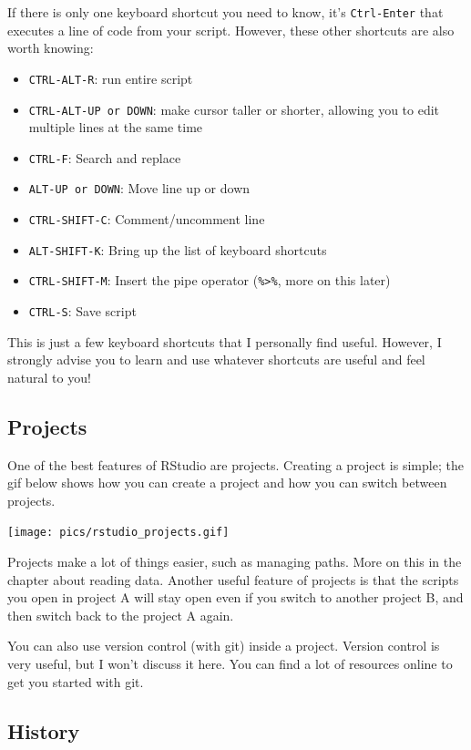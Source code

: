 \documentclass[
]{article}
\providecommand{\tightlist}{%
  \setlength{\itemsep}{0pt}\setlength{\parskip}{0pt}}
\begin{document}
If there is only one keyboard shortcut you need to know, it's \texttt{Ctrl-Enter} that executes a line of code
from your script. However, these other shortcuts are also worth knowing:

\begin{itemize}
\tightlist
\item
  \texttt{CTRL-ALT-R}: run entire script
\item
  \texttt{CTRL-ALT-UP\ or\ DOWN}: make cursor taller or shorter, allowing you to edit multiple lines at the same time
\item
  \texttt{CTRL-F}: Search and replace
\item
  \texttt{ALT-UP\ or\ DOWN}: Move line up or down
\item
  \texttt{CTRL-SHIFT-C}: Comment/uncomment line
\item
  \texttt{ALT-SHIFT-K}: Bring up the list of keyboard shortcuts
\item
  \texttt{CTRL-SHIFT-M}: Insert the pipe operator (\texttt{\%\textgreater{}\%}, more on this later)
\item
  \texttt{CTRL-S}: Save script
\end{itemize}

This is just a few keyboard shortcuts that I personally find useful. However, I strongly advise you
to learn and use whatever shortcuts are useful and feel natural to you!

\hypertarget{projects}{%
\subsection{Projects}\label{projects}}

One of the best features of RStudio are projects. Creating a project is simple; the gif below
shows how you can create a project and how you can switch between projects.

\texttt{[image: pics/rstudio\_projects.gif]}

Projects make a lot of things easier, such as managing paths. More on this in the chapter about
reading data. Another useful feature of projects is that the scripts you open in project A will
stay open even if you switch to another project B, and then switch back to the project A again.

You can also use version control (with git) inside a project. Version control is very useful, but
I won't discuss it here. You can find a lot of resources online to get you started with git.

\hypertarget{history}{%
\subsection{History}\label{history}}
\end{document}
